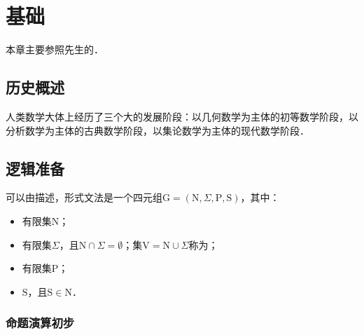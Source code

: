 \chapter{基础}

本章主要参照\citeauthor{WangFt2001}先生的\cite{WangFt2001}．

\section{历史概述}

人类数学大体上经历了三个大的发展阶段：以几何数学为主体的初等数学阶段，以分析数学为主体的古典数学阶段，以集论数学为主体的现代数学阶段．

\section{逻辑准备}


可以由描述，形式文法是一个四元组$\mathrm{G}=(\mathrm{N},\Sigma,\mathrm{P},\mathrm{S})$，其中：
\begin{itemize}
	\item {}有限集$\mathrm{N}$；
	\item {}有限集$\Sigma$，且$\mathrm{N}\cap\Sigma=\emptyset$；集$\mathrm{V}=\mathrm{N}\cup\Sigma$称为；
	\item {}有限集$\mathrm{P}$；
	\item {}$\mathrm{S}$，且$\mathrm{S}\in\mathrm{N}$．
\end{itemize}

\subsection{命题演算初步}

